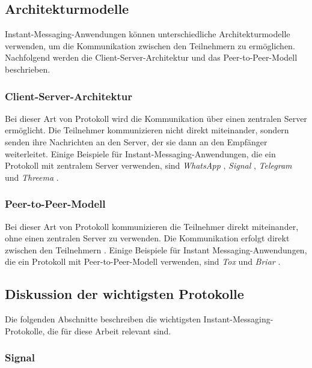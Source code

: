 \subsection{Architekturmodelle}

Instant-Messaging-Anwendungen können unterschiedliche Architekturmodelle verwenden, um die Kommunikation zwischen den Teilnehmern zu ermöglichen. Nachfolgend werden die Client-Server-Architektur und das Peer-to-Peer-Modell beschrieben.

\subsubsection{Client-Server-Architektur}

Bei dieser Art von Protokoll wird die Kommunikation über einen zentralen Server ermöglicht. Die Teilnehmer kommunizieren nicht direkt miteinander, sondern senden ihre Nachrichten an den Server, der sie dann an den Empfänger weiterleitet\Parencite[S. 3]{Hanson_ServerManagement}. Einige Beispiele für Instant-Messaging-Anwendungen, die ein Protokoll mit zentralem Server verwenden, sind \textit{WhatsApp} \parencite{Vanerio_WhatsAppArchitecture}, \textit{Signal} \parencite{Github_libsignal}, \textit{Telegram} \parencite{Telegram_ServerSourceCode} und \textit{Threema} \parencite{Threema_ServerLocation}.

\subsubsection{Peer-to-Peer-Modell}

Bei dieser Art von Protokoll kommunizieren die Teilnehmer direkt miteinander, ohne einen zentralen Server zu verwenden. Die Kommunikation erfolgt direkt zwischen den Teilnehmern \parencites[S. 6-8]{Mahlmann_P2PNetzwerke}{Galuba_P2POverlayNetworks}. Einige Beispiele für Instant Messaging-Anwendungen, die ein Protokoll mit Peer-to-Peer-Modell verwenden, sind \textit{Tox} \parencite{Tox_FAQ} und \textit{Briar} \parencite{Briar_HowItWorks}.


\subsection{Diskussion der wichtigsten Protokolle}

Die folgenden Abschnitte beschreiben die wichtigsten Instant-Messaging-Protokolle, die für diese Arbeit relevant sind.

\subsubsection{Signal}
\label{subsubsection:signal}

